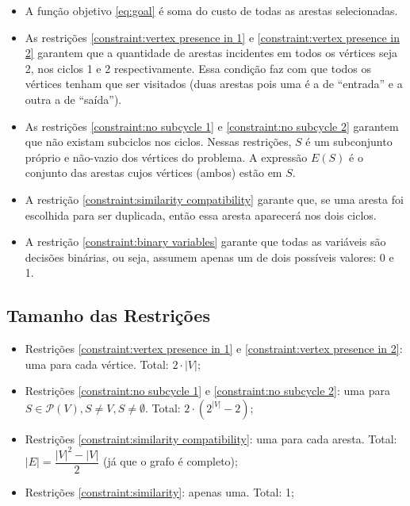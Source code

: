\documentclass{article}
\newcommand{\partsof}[1]{\ensuremath{\mathcal{P}\left(#1\right)}}
\newcommand{\abs}[1]{\ensuremath{\left| #1 \right|}}
\newcommand{\edges}{\ensuremath{E}}
\newcommand{\vertices}{\ensuremath{V}}
\newcommand{\subvertices}{\ensuremath{S}}
\begin{document}
\begin{itemize}
    \item A função objetivo \eqref{eq:goal} é soma do custo de todas as arestas selecionadas.
    \item As restrições \eqref{constraint:vertex presence in 1} e \eqref{constraint:vertex presence in 2} garantem que a quantidade de arestas incidentes em todos os vértices seja 2, nos ciclos 1 e 2 respectivamente. Essa condição faz com que todos os vértices tenham que ser visitados (duas arestas pois uma é a de ``entrada'' e a outra a de ``saída''). 
    \item As restrições \eqref{constraint:no subcycle 1} e \eqref{constraint:no subcycle 2} garantem que não existam subciclos nos ciclos. Nessas restrições, $\subvertices$ é um subconjunto próprio e não-vazio dos vértices do problema. A expressão $\edges(\subvertices)$ é o conjunto das arestas cujos vértices (ambos) estão em $\subvertices$.
    \item A restrição \eqref{constraint:similarity compatibility} garante que, se uma aresta foi escolhida para ser duplicada, então essa aresta aparecerá nos dois ciclos.
    \item A restrição \eqref{constraint:binary variables} garante que todas as variáveis são decisões binárias, ou seja, assumem apenas um de dois possíveis valores: 0 e 1.
\end{itemize}

\subsection{Tamanho das Restrições}

\begin{itemize}
	\item Restrições \eqref{constraint:vertex presence in 1} e \eqref{constraint:vertex presence in 2}: uma para cada vértice. Total: $2 \cdot \abs{\vertices}$;
	\item Restrições \eqref{constraint:no subcycle 1} e \eqref{constraint:no subcycle 2}: uma para $\subvertices \in \partsof{\vertices}, \subvertices \neq \vertices, \subvertices \neq \emptyset$. Total: $2 \cdot \left( 2^{\abs{\vertices}} - 2\right)$;
	\item Restrições \eqref{constraint:similarity compatibility}: uma para cada aresta. Total: $\abs{\edges} = \dfrac{\abs{\vertices}^2 - \abs{\vertices}}{2}$ (já que o grafo é completo);
	\item Restrições \ref{constraint:similarity}: apenas uma. Total: 1;
\end{itemize}
\end{document}
